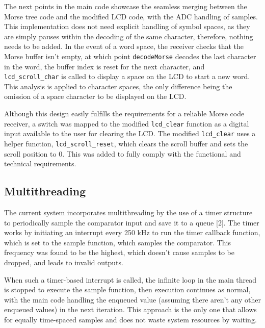 \documentclass[head=13.6pt]{cce2014-design}
\begin{document}
The next points in the main code showcase the seamless merging between the Morse tree code and the modified LCD code, with the ADC handling of samples. This implementation does not need explicit handling of symbol spaces, as they are simply pauses within the decoding of the same character, therefore, nothing needs to be added. In the event of a word space, the receiver checks that the Morse buffer isn’t empty, at which point \texttt{decodeMorse} decodes the last character in the word, the buffer index is reset for the next character, and \texttt{lcd\_scroll\_char} is called to display a space on the LCD to start a new word.
This analysis is applied to character spaces, the only difference being the omission of a space character to be displayed on the LCD.

Although this design easily fulfills the requirements for a reliable Morse code receiver, a switch was mapped to the modified \texttt{lcd\_clear} function as a digital input available to the user for clearing the LCD. The modified \texttt{lcd\_clear} uses a helper function, \texttt{lcd\_scroll\_reset}, which clears the scroll buffer and sets the scroll position to 0. This was added to fully comply with the functional and technical requirements.

\subsection{Multithreading}
The current system incorporates multithreading by the use of a timer structure to periodically sample the comparator input and save it to a queue [2]. The timer works by initiating an interrupt every 250 kHz to run the timer callback function, which is set to the sample function, which samples the comparator. This frequency was found to be the highest, which doesn't cause samples to be dropped, and leads to invalid outputs.

When such a timer-based interrupt is called, the infinite loop in the main thread is stopped to execute the sample function, then execution continues as normal, with the main code handling the enqueued value (assuming there aren’t any other enqueued values) in the next iteration. This approach is the only one that allows for equally time-spaced samples and does not waste system resources by waiting.
\end{document}
